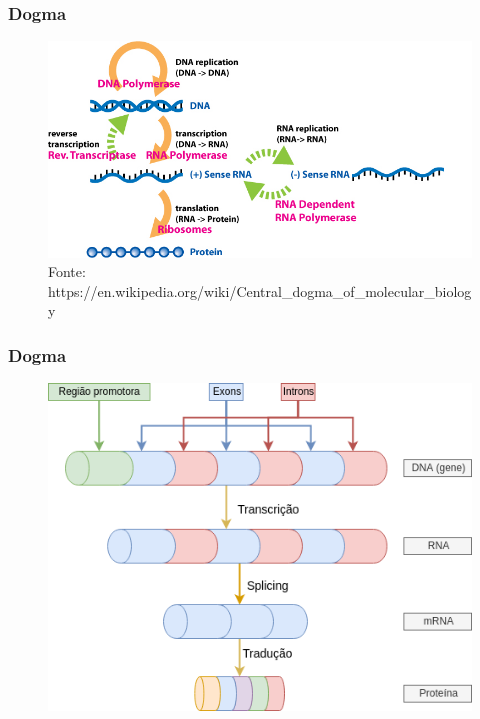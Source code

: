 \documentclass{beamer}
\begin{document}
		\begin{frame}\frametitle{Dogma}
		\begin{figure}[hbtp]
			\centering
			\includegraphics[scale=0.45]{img/dogma.png}
			\caption{\tiny{Fonte: https://en.wikipedia.org/wiki/Central\_dogma\_of\_molecular\_biology}}
		\end{figure}
		\end{frame}

		\begin{frame} \frametitle{Dogma}
		\begin{figure}[hbtp]
			\centering
			\includegraphics[scale=0.5]{img/dogma_tt.png}
		\end{figure}
		\end{frame}
		
\end{document}
